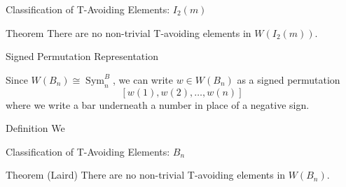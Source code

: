 \documentclass[9pt,handout]{beamer}
\DeclareMathOperator{\Sym}{Sym}
\begin{document}


\begin{frame}{Classification of T-Avoiding Elements: $I_2(m)$}

\begin{block}{Theorem}
	There are no non-trivial T-avoiding elements in $W(I_2(m))$.
\end{block}

\end{frame}




\begin{frame}{Signed Permutation Representation}

Since $W(B_n) \cong \Sym_n^B$, we can write $w \in W(B_n)$ as a signed permutation 
\[[w(1), w(2), \ldots, w(n)]\] where we write a bar underneath a number in place of a negative sign.

\pause

\begin{block}{Definition}
	We 
\end{block}

	
\end{frame}




\begin{frame}{Classification of T-Avoiding Elements: $B_n$}

\begin{block}{Theorem (Laird)}
	There are no non-trivial T-avoiding elements in $W(B_n)$.
\end{block}

\end{frame}
\end{document}
